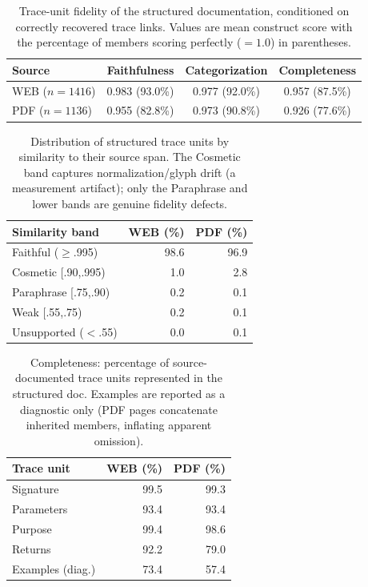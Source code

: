 \begin{table}[t]
\centering
\caption{Trace-unit fidelity of the structured documentation, conditioned on correctly recovered trace links. Values are mean construct score with the percentage of members scoring perfectly ($=1.0$) in parentheses.}
\label{tab:fidelity-headline}
\begin{tabular}{lccc}
\toprule
Source & Faithfulness & Categorization & Completeness \\
\midrule
WEB ($n{=}1416$) & 0.983 (93.0\%) & 0.977 (92.0\%) & 0.957 (87.5\%) \\
PDF ($n{=}1136$) & 0.955 (82.8\%) & 0.973 (90.8\%) & 0.926 (77.6\%) \\
\bottomrule
\end{tabular}
\end{table}

\begin{table}[t]
\centering
\caption{Distribution of structured trace units by similarity to their source span. The Cosmetic band captures normalization/glyph drift (a measurement artifact); only the Paraphrase and lower bands are genuine fidelity defects.}
\label{tab:fidelity-bands}
\begin{tabular}{lrr}
\toprule
Similarity band & WEB (\%) & PDF (\%) \\
\midrule
Faithful ($\geq$.995) & 98.6 & 96.9 \\
Cosmetic [.90,.995) & 1.0 & 2.8 \\
Paraphrase [.75,.90) & 0.2 & 0.1 \\
Weak [.55,.75) & 0.2 & 0.1 \\
Unsupported ($<$.55) & 0.0 & 0.1 \\
\bottomrule
\end{tabular}
\end{table}

\begin{table}[t]
\centering
\caption{Completeness: percentage of source-documented trace units represented in the structured doc. Examples are reported as a diagnostic only (PDF pages concatenate inherited members, inflating apparent omission).}
\label{tab:fidelity-completeness}
\begin{tabular}{lrr}
\toprule
Trace unit & WEB (\%) & PDF (\%) \\
\midrule
Signature & 99.5 & 99.3 \\
Parameters & 93.4 & 93.4 \\
Purpose & 99.4 & 98.6 \\
Returns & 92.2 & 79.0 \\
\midrule
Examples (diag.) & 73.4 & 57.4 \\
\bottomrule
\end{tabular}
\end{table}

